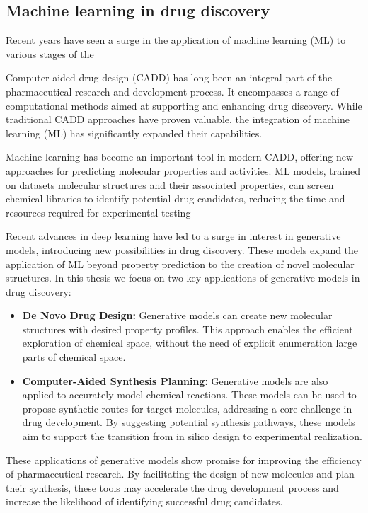 \subsection{Machine learning in drug discovery}
Recent years have seen a surge in the application of machine learning (ML) to various stages of the

Computer-aided drug design (CADD) has long been an integral part of the pharmaceutical research and
development process. It encompasses a range of computational methods aimed at supporting and
enhancing drug discovery. While traditional CADD approaches have proven valuable, the integration of
machine learning (ML) has significantly expanded their capabilities.

Machine learning has become an important tool in modern CADD, offering new approaches for predicting
molecular properties and activities. ML models, trained on datasets molecular structures and their
associated properties, can screen chemical libraries to identify potential drug candidates, reducing
the time and resources required for experimental testing

Recent advances in deep learning have led to a surge in interest in generative models, introducing
new possibilities in drug discovery. These models expand the application of ML beyond property
prediction to the creation of novel molecular structures. In this thesis we focus on two key
applications of generative models in drug discovery:
\begin{itemize}
      \item \textbf{De Novo Drug Design:} Generative models can create new molecular structures with desired property
            profiles. This approach enables the efficient exploration of chemical space, without the need of
            explicit enumeration large parts of chemical space.
      \item \textbf{Computer-Aided Synthesis Planning:} Generative models are also applied to accurately model
            chemical reactions. These models can be used to propose synthetic routes
            for target molecules, addressing a core challenge in drug development. By suggesting potential synthesis
            pathways, these models aim to support the transition from in silico design to experimental
            realization.
\end{itemize}

These applications of generative models show promise for improving the efficiency
of pharmaceutical research. By facilitating the design of new molecules and plan their
synthesis, these tools may accelerate the drug development process and increase the likelihood of
identifying successful drug candidates.

